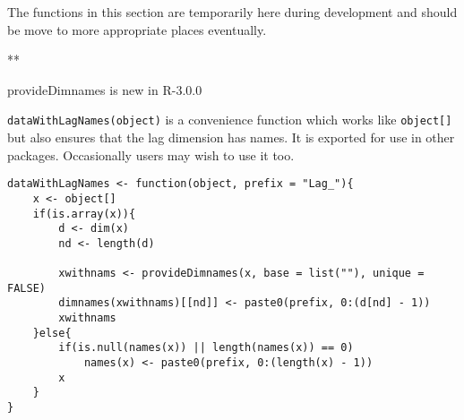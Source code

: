 \documentclass[11pt,a4paper]{article}
\begin{document}
The functions in this section are temporarily here during development and should be move to
more appropriate places eventually.

**

provideDimnames is new in R-3.0.0

\texttt{dataWithLagNames(object)} is a convenience function which works like
\texttt{object[]} but also ensures that the lag dimension has names. It is exported for use in other
packages. Occasionally users may wish to use it too.
\begin{verbatim}
dataWithLagNames <- function(object, prefix = "Lag_"){
    x <- object[]
    if(is.array(x)){
        d <- dim(x)
        nd <- length(d)

        xwithnams <- provideDimnames(x, base = list(""), unique = FALSE)
        dimnames(xwithnams)[[nd]] <- paste0(prefix, 0:(d[nd] - 1))
        xwithnams
    }else{
        if(is.null(names(x)) || length(names(x)) == 0)
            names(x) <- paste0(prefix, 0:(length(x) - 1))
        x
    }
}
\end{verbatim}
\end{document}
